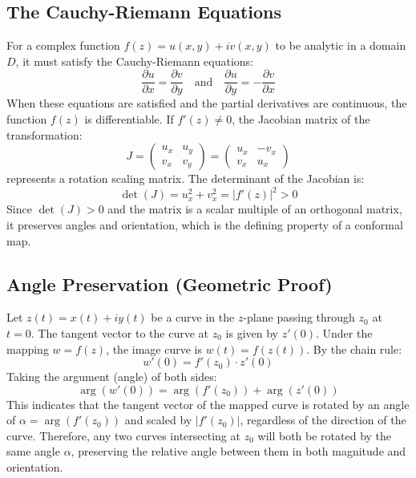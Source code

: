 \documentclass[12pt,a4paper]{article}
\begin{document}
\subsection{The Cauchy-Riemann Equations}
For a complex function $f(z) = u(x,y) + iv(x,y)$ to be analytic in a domain $D$, it must satisfy the Cauchy-Riemann equations:
\begin{equation}
    \frac{\partial u}{\partial x} = \frac{\partial v}{\partial y} \quad \text{and} \quad \frac{\partial u}{\partial y} = -\frac{\partial v}{\partial x}
\end{equation}
When these equations are satisfied and the partial derivatives are continuous, the function $f(z)$ is differentiable. If $f'(z) \neq 0$, the Jacobian matrix of the transformation:
\begin{equation}
    J = \begin{pmatrix}
        u_x & u_y \\
        v_x & v_y
    \end{pmatrix} = \begin{pmatrix}
        u_x & -v_x \\
        v_x & u_x
    \end{pmatrix}
\end{equation}
represents a rotation scaling matrix. The determinant of the Jacobian is:
\begin{equation}
    \det(J) = u_x^2 + v_x^2 = |f'(z)|^2 > 0
\end{equation}
Since $\det(J) > 0$ and the matrix is a scalar multiple of an orthogonal matrix, it preserves angles and orientation, which is the defining property of a conformal map.

\subsection{Angle Preservation (Geometric Proof)}
Let $z(t) = x(t) + iy(t)$ be a curve in the $z$-plane passing through $z_0$ at $t = 0$. The tangent vector to the curve at $z_0$ is given by $z'(0)$. Under the mapping $w = f(z)$, the image curve is $w(t) = f(z(t))$. By the chain rule:
\begin{equation}
    w'(0) = f'(z_0) \cdot z'(0)
\end{equation}
Taking the argument (angle) of both sides:
\begin{equation}
    \arg(w'(0)) = \arg(f'(z_0)) + \arg(z'(0))
\end{equation}
This indicates that the tangent vector of the mapped curve is rotated by an angle of $\alpha = \arg(f'(z_0))$ and scaled by $|f'(z_0)|$, regardless of the direction of the curve. Therefore, any two curves intersecting at $z_0$ will both be rotated by the same angle $\alpha$, preserving the relative angle between them in both magnitude and orientation.
\end{document}
